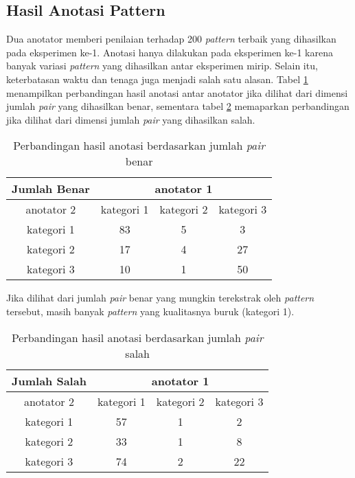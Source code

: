 \subsection{Hasil Anotasi Pattern}
Dua anotator memberi penilaian terhadap 200 \textit{pattern} terbaik yang dihasilkan pada eksperimen ke-1. Anotasi hanya dilakukan pada eksperimen ke-1 karena banyak variasi \textit{pattern} yang dihasilkan antar eksperimen mirip. Selain itu, keterbatasan waktu dan tenaga juga menjadi salah satu alasan. Tabel \ref{table:p-anotasi-benar} menampilkan perbandingan hasil anotasi antar anotator jika dilihat dari dimensi jumlah \textit{pair} yang dihasilkan benar, sementara tabel \ref{table:p-anotasi-salah} memaparkan perbandingan jika dilihat dari dimensi jumlah \textit{pair} yang dihasilkan salah.

\begin{table}
  \centering
  \caption{Perbandingan hasil anotasi berdasarkan jumlah \textit{pair} benar}
  \label{table:p-anotasi-benar}
  \begin{tabular}{|c|c|c|c|}
  \hline
  Jumlah Benar & \multicolumn{3}{c}{ anotator 1 } \\ \hline
  anotator 2 & kategori 1 & kategori 2 & kategori 3 \\ \hline
  kategori 1 & 83 & 5 & 3 \\ \hline
  kategori 2 & 17 & 4 & 27 \\ \hline
  kategori 3 & 10 & 1 & 50 \\ \hline
  \end{tabular} 
\end{table}

\noindent Jika dilihat dari jumlah \textit{pair} benar yang mungkin terekstrak oleh \textit{pattern} tersebut, masih banyak \textit{pattern} yang kualitasnya buruk (kategori 1).

\begin{table}
  \centering
  \caption{Perbandingan hasil anotasi berdasarkan jumlah \textit{pair} salah}
  \label{table:p-anotasi-salah}
  \begin{tabular}{|c|c|c|c|}
  \hline
  Jumlah Salah & \multicolumn{3}{c}{ anotator 1 } \\ \hline
  anotator 2 & kategori 1 & kategori 2 & kategori 3 \\ \hline
  kategori 1 & 57 & 1 & 2 \\ \hline
  kategori 2 & 33 & 1 & 8 \\ \hline
  kategori 3 & 74 & 2 & 22 \\ \hline
  \end{tabular} 
\end{table}

